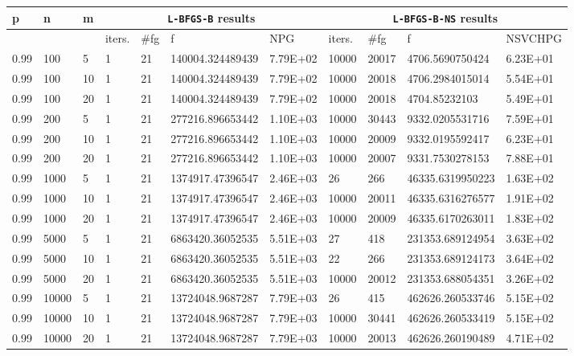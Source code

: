 \begin{table}
  \tiny
  \begin{center}
    \begin{tabular}{|l|l|l|l|l|l|l|l|l|l|l|}
      \hline
      p  & n & m  & \multicolumn{4}{|c|}{\texttt{L-BFGS-B} results} & \multicolumn{4}{|c|}{\texttt{L-BFGS-B-NS} results} \\ \hline
      &  &  & iters. & \#fg & f & NPG & iters. & \#fg & f & NSVCHPG \\ \hline
      0.99 & 100 & 5 & 1 & 21 & 140004.324489439 & 7.79E+02 & 10000 & 20017 & 4706.5690750424 & 6.23E+01 \\
      0.99 & 100 & 10 & 1 & 21 & 140004.324489439 & 7.79E+02 & 10000 & 20018 & 4706.2984015014 & 5.54E+01\\
      0.99 & 100 & 20 & 1 & 21 & 140004.324489439 & 7.79E+02 & 10000 & 20018 & 4704.85232103 & 5.49E+01\\
      0.99 & 200 & 5 & 1 & 21 & 277216.896653442 & 1.10E+03 & 10000 & 30443 & 9332.0205531716 & 7.59E+01\\
      0.99 & 200 & 10 & 1 & 21 & 277216.896653442 & 1.10E+03 & 10000 & 20009 & 9332.0195592417 & 6.23E+01\\
      0.99 & 200 & 20 & 1 & 21 & 277216.896653442 & 1.10E+03 & 10000 & 20007 & 9331.7530278153 & 7.88E+01\\
      0.99 & 1000 & 5 & 1 & 21 & 1374917.47396547 & 2.46E+03 & 26 & 266 & 46335.6319950223 & 1.63E+02\\
      0.99 & 1000 & 10 & 1 & 21 & 1374917.47396547 & 2.46E+03 & 10000 & 20011 & 46335.6316276577 & 1.91E+02\\
      0.99 & 1000 & 20 & 1 & 21 & 1374917.47396547 & 2.46E+03 & 10000 & 20009 & 46335.6170263011 & 1.83E+02\\
      0.99 & 5000 & 5 & 1 & 21 & 6863420.36052535 & 5.51E+03 & 27 & 418 & 231353.689124954 & 3.63E+02\\
      0.99 & 5000 & 10 & 1 & 21 & 6863420.36052535 & 5.51E+03 & 22 & 266 & 231353.689124173 & 3.64E+02\\
      0.99 & 5000 & 20 & 1 & 21 & 6863420.36052535 & 5.51E+03 & 10000 & 20012 & 231353.688054351 & 3.26E+02\\
      0.99 & 10000 & 5 & 1 & 21 & 13724048.9687287 & 7.79E+03 & 26 & 415 & 462626.260533746 & 5.15E+02\\
      0.99 & 10000 & 10 & 1 & 21 & 13724048.9687287 & 7.79E+03 & 10000 & 30441 & 462626.260533419 & 5.15E+02\\
      0.99 & 10000 & 20 & 1 & 21 & 13724048.9687287 & 7.79E+03 & 10000 & 20013 & 462626.260190489 & 4.71E+02\\

\end{tabular}
\end{center}
\end{table}
